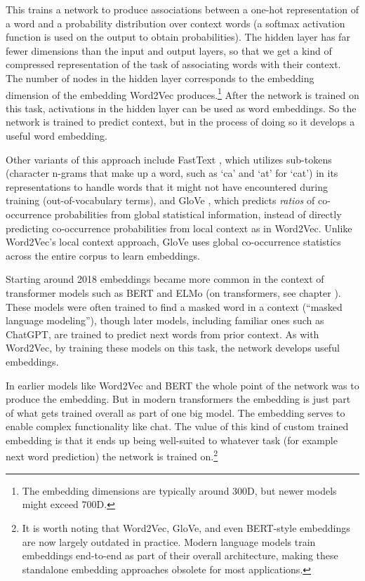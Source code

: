 This trains a network to produce associations between a one-hot representation of a word and a probability distribution over context words (a softmax activation function is used on the output to obtain probabilities). The hidden layer has far fewer dimensions than the input and output layers, so that we get a kind of compressed representation of the task of associating words with their context. The number of nodes in the hidden layer corresponds to the embedding dimension of the embedding Word2Vec produces.\footnote{The embedding dimensions are typically around 300D, but newer models might exceed 700D.}  After the network is trained on this task, activations in the hidden layer can be used as word embeddings. So the network is trained to predict context, but in the process of doing so it develops a useful word embedding. 

Other variants of this approach include FastText \cite{bojanowski2016enriching}, which utilizes sub-tokens (character n-grams that make up a word, such as `ca' and `at' for `cat') in its representations to handle words that it might not have encountered during training (out-of-vocabulary terms), and GloVe \cite{pennington2014glove}, which predicts \textit{ratios} of co-occurrence probabilities from global statistical information, instead of directly predicting co-occurrence probabilities from local context as in Word2Vec. Unlike Word2Vec's local context approach, GloVe uses global co-occurrence statistics across the entire corpus to learn embeddings. 

Starting around 2018 embeddings became more common in the context of transformer models such as BERT and ELMo  (on transformers, see chapter ). These models were often trained to find a masked word in a context (``masked language modeling''), though later models, including familiar ones such as ChatGPT, are trained to predict next words from prior context. As with Word2Vec, by training these models on this task, the network develops useful embeddings.  

In earlier models like Word2Vec and BERT the whole point of the network was to produce the embedding. But in modern transformers the embedding is just part of what gets trained overall as part of one big model. The embedding serves to enable complex functionality like chat. The value of this kind of custom trained embedding is that it ends up being well-suited to whatever task (for example next word prediction) the network is trained on.\footnote{It is worth noting that Word2Vec, GloVe, and even BERT-style embeddings are now largely outdated in practice. Modern language models train embeddings end-to-end as part of their overall architecture, making these standalone embedding approaches obsolete for most applications.}

